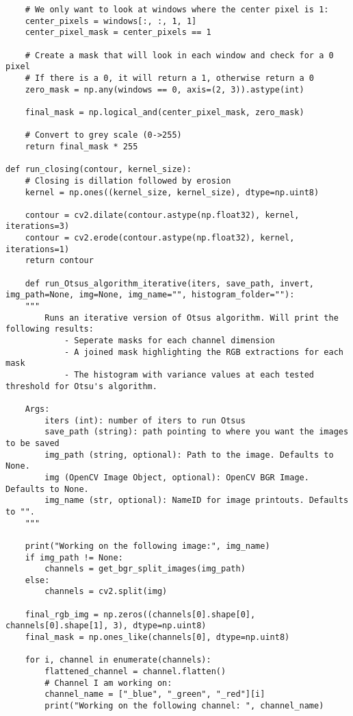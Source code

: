 \documentclass{article}
\begin{document}
\begin{lstlisting}
    # We only want to look at windows where the center pixel is 1:
    center_pixels = windows[:, :, 1, 1]
    center_pixel_mask = center_pixels == 1
    
    # Create a mask that will look in each window and check for a 0 pixel
    # If there is a 0, it will return a 1, otherwise return a 0
    zero_mask = np.any(windows == 0, axis=(2, 3)).astype(int)
    
    final_mask = np.logical_and(center_pixel_mask, zero_mask)

    # Convert to grey scale (0->255)
    return final_mask * 255

def run_closing(contour, kernel_size):
    # Closing is dillation followed by erosion
    kernel = np.ones((kernel_size, kernel_size), dtype=np.uint8)

    contour = cv2.dilate(contour.astype(np.float32), kernel, iterations=3)
    contour = cv2.erode(contour.astype(np.float32), kernel, iterations=1)
    return contour

    def run_Otsus_algorithm_iterative(iters, save_path, invert, img_path=None, img=None, img_name="", histogram_folder=""):
    """
        Runs an iterative version of Otsus algorithm. Will print the following results:
            - Seperate masks for each channel dimension  
            - A joined mask highlighting the RGB extractions for each mask  
            - The histogram with variance values at each tested threshold for Otsu's algorithm.  

    Args:
        iters (int): number of iters to run Otsus
        save_path (string): path pointing to where you want the images to be saved
        img_path (string, optional): Path to the image. Defaults to None.
        img (OpenCV Image Object, optional): OpenCV BGR Image. Defaults to None.
        img_name (str, optional): NameID for image printouts. Defaults to "".
    """

    print("Working on the following image:", img_name)
    if img_path != None:
        channels = get_bgr_split_images(img_path)
    else:
        channels = cv2.split(img)
    
    final_rgb_img = np.zeros((channels[0].shape[0], channels[0].shape[1], 3), dtype=np.uint8)
    final_mask = np.ones_like(channels[0], dtype=np.uint8)
    
    for i, channel in enumerate(channels):
        flattened_channel = channel.flatten()
        # Channel I am working on:
        channel_name = ["_blue", "_green", "_red"][i]
        print("Working on the following channel: ", channel_name)
        

\end{lstlisting}
\end{document}
